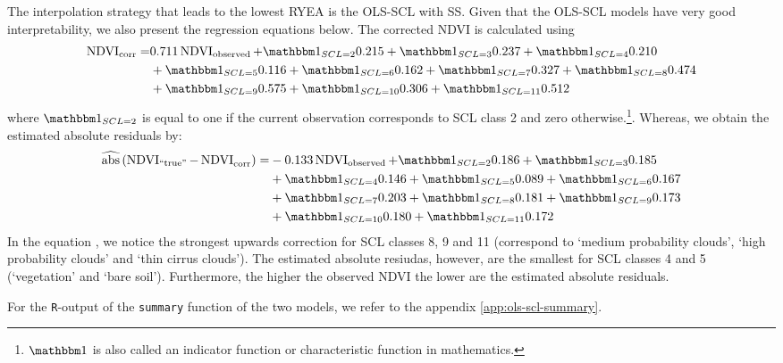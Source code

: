 	The interpolation strategy that leads to the lowest RYEA is the OLS-SCL with SS. Given that the OLS-SCL models have very good interpretability, we also present the regression equations below. The corrected NDVI is calculated using 
	\begin{equation}\label{eq:corr_lm}
		\begin{aligned}		
			{\operatorname{NDVI}}_{\text{corr}}  = &
			0.711 \operatorname{NDVI}_\text{observed}  
			+ \mathbbm 1_{{SCL = 2}} 0.215 
			+ \mathbbm 1_{{SCL = 3}} 0.237 
			+ \mathbbm 1_{{SCL = 4}} 0.210 \\ &
			+ \mathbbm 1_{{SCL = 5}} 0.116 
			+ \mathbbm 1_{{SCL = 6}} 0.162 
			+ \mathbbm 1_{{SCL = 7}} 0.327 
			+ \mathbbm 1_{{SCL = 8}} 0.474 \\ &
			+ \mathbbm 1_{{SCL = 9}} 0.575 
			+ \mathbbm 1_{{SCL = 10}} 0.306 
			+ \mathbbm 1_{{SCL = 11}} 0.512 
		\end{aligned}
	\end{equation} 
	where $\mathbbm 1_{{SCL = 2}}$ is equal to one if the current observation corresponds to SCL class 2 and zero otherwise.\footnote{$\mathbbm 1$ is also called an indicator function or characteristic function in mathematics.}. Whereas, we obtain the estimated absolute residuals by: 
	\begin{equation}\label{eq:corr_lm_res}
		\begin{aligned}		
			\widehat{\operatorname{abs}}\left({\operatorname{NDVI}_\text{``true''} - \operatorname{NDVI}}_{\text{corr}}\right)  = &
			-0.133 \operatorname{NDVI}_\text{observed}  
			+ \mathbbm 1_{{SCL = 2}} 0.186 
			+ \mathbbm 1_{{SCL = 3}} 0.185 \\ &
			+ \mathbbm 1_{{SCL = 4}} 0.146 
			+ \mathbbm 1_{{SCL = 5}} 0.089 
			+ \mathbbm 1_{{SCL = 6}} 0.167 \\ &
			+ \mathbbm 1_{{SCL = 7}} 0.203 
			+ \mathbbm 1_{{SCL = 8}} 0.181  
			+ \mathbbm 1_{{SCL = 9}} 0.173 \\ &
			+ \mathbbm 1_{{SCL = 10}} 0.180 
			+ \mathbbm 1_{{SCL = 11}} 0.172 
		\end{aligned}
	\end{equation} 
	In the equation , we notice the strongest upwards correction for SCL classes 8, 9 and 11 (correspond to `medium probability clouds', `high probability clouds' and `thin cirrus clouds'). The estimated absolute resiudas, however, are the smallest for SCL classes 4 and 5 (`vegetation' and `bare soil'). Furthermore, the higher the observed NDVI the lower are the estimated absolute residuals.

	For the \texttt{R}-output of the \texttt{summary} function of the two models, we refer to the appendix \ref{app:ols-scl-summary}. 


	







